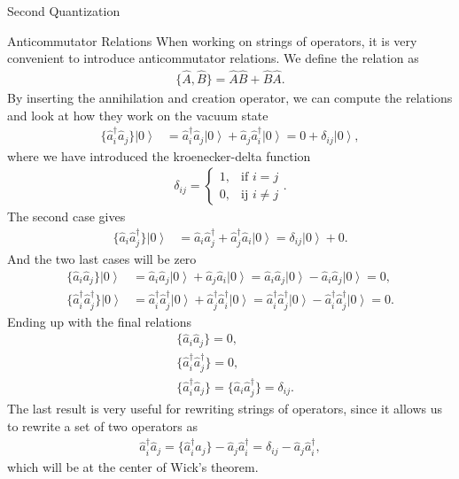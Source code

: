 \documentclass[twoside,english]{uiofysmaster}
\begin{document}
\begin{chapter}{Second Quantization}
	\begin{section}{Anticommutator Relations}
		When working on strings of operators, it is very convenient to introduce anticommutator relations. We define the relation as 
		\begin{align}
			\{ \hat A, \hat B \} = \hat A \hat B + \hat B \hat A.
		\end{align}
		By inserting the annihilation and creation operator, we can compute the relations and look at how they work on the vacuum state 
		\begin{align}
			\{ \hat a_i^\dagger \hat a_j \} \left| 0 \right>  &= \hat a_i^\dagger \hat a_j \left| 0 \right>  + \hat a_j \hat a_i^\dagger \left| 0 \right> = 0 + \delta_{ij} \left|0\right>,
 		\end{align}
 		where we have introduced the kroenecker-delta function
 		\begin{align}
 			\delta_{ij} = \begin{cases}
 						1, & \text{if } i = j \\
 						0, & \text{ij } i \neq j
 						\end{cases}.
 		\end{align}
		The second case gives
		\begin{align}
			\{ \hat a_i \hat a_j^\dagger \} \left| 0 \right> &= \hat a_i \hat a_j^\dagger + \hat a_j^\dagger \hat a_i \left| 0 \right> = \delta_{ij} \left| 0 \right> + 0.
		\end{align}
		And the two last cases will be zero
 		\begin{align}
			\{ \hat a_i \hat a_j \} \left| 0 \right> &= \hat a_i \hat a_j \left| 0 \right> + \hat a_j \hat a_i \left| 0 \right> = \hat a_i \hat a_j \left| 0 \right> - \hat a_i \hat a_j \left| 0 \right> = 0,\\
			\{ \hat a_i^\dagger \hat a_j^\dagger \} \left| 0 \right> &= \hat a_i^\dagger \hat a_j^\dagger \left| 0 \right> + \hat a_j^\dagger \hat a_i^\dagger \left| 0 \right> = \hat a_i^\dagger \hat a_j^\dagger \left| 0 \right> - \hat a_i^\dagger \hat a_j^\dagger \left| 0 \right> = 0.
 		\end{align}
 		Ending up with the final relations
 		\begin{align}
 			&\{ \hat a_i \hat a_j \} = 0, \\
 			&\{ \hat a_i^\dagger \hat a_j^\dagger \} = 0, \\
			&\{ \hat a_i^\dagger \hat a_j \} = \{ \hat a_i \hat a_j^\dagger \} = \delta_{ij}.
		\end{align}
		The last result is very useful for rewriting strings of operators, since it allows us to rewrite a set of two operators as
		\begin{align}
			\hat a_i^\dagger \hat a_j = \{ \hat a_i^\dagger \hat a_j \} - \hat a_j \hat a_i^\dagger = \delta_{ij} - \hat a_j \hat a_i^\dagger ,
			\label{interchange operators}
		\end{align}
		which will be at the center of Wick's theorem. 
	\end{section}


\end{chapter}
\end{document}
